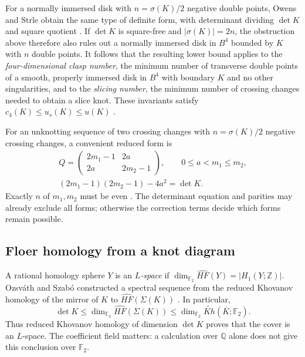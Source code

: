 \documentclass[12pt, oneside]{amsart}
\newcommand{\bbz}{{\mathbb Z}}
\newcommand{\bbq}{{\mathbb Q}}
\newcommand{\dbc}{\Sigma}
\begin{document}
For a normally immersed disk with $n=\sigma(K)/2$ negative double points,
Owens and Strle obtain the same type of definite form, with determinant dividing
$\det K$ and square quotient \cite[Thm.~1]{OwensStrle}.
If $\det K$ is square-free and $|\sigma(K)|=2n$, the obstruction above therefore
also rules out a normally immersed disk in $B^4$ bounded by $K$ with $n$ double
points. It follows that the resulting lower bound applies to the
\emph{four-dimensional clasp number}, the minimum number of transverse double
points of a smooth, properly immersed disk in $B^4$ with boundary $K$ and no other
singularities, and to the \emph{slicing number}, the minimum number of crossing changes
needed to obtain a slice knot. These invariants satisfy
$c_4(K)\le u_s(K)\le u(K)$ \cite[\S1]{OwensStrle}.

For an unknotting sequence of two crossing changes with $n=\sigma(K)/2$ negative
crossing changes, a convenient reduced form is
\begin{equation}\label{eq:qtilde}
    \begin{gathered}
    Q=\begin{pmatrix}2m_1-1&2a\\2a&2m_2-1\end{pmatrix},\qquad 0\le a<m_1\le m_2,\\
    (2m_1-1)(2m_2-1)-4a^2=\det K.
    \end{gathered}
\end{equation}
Exactly $n$ of $m_1,m_2$ must be even \cite[Thm.~1]{Owens}.
The determinant equation and parities may already exclude all forms; otherwise the
correction terms decide which forms remain possible.

\subsection{Floer homology from a knot diagram}\label{sec:greene-background}

A rational homology sphere $Y$ is an \emph{$L$-space} if
$\dim_{\mathbb F_2}\widehat{HF}(Y)=|H_1(Y;\bbz)|$. Ozsv\'ath and Szab\'o
constructed a spectral sequence from the reduced Khovanov homology of the mirror
of $K$ to $\widehat{HF}(\dbc(K))$ \cite[Thm.~1.1 and Cor.~1.2]{OSbranched}. In particular,
\begin{equation}\label{eq:kh-lspace}
    \det K\le \dim_{\mathbb F_2}\widehat{HF}(\dbc(K))
       \le \dim_{\mathbb F_2}\widetilde{Kh}(\overline K;\mathbb F_2).
\end{equation}
Thus reduced Khovanov homology of dimension $\det K$ proves that the cover is an
$L$-space. The coefficient field matters: a calculation over $\bbq$ alone does not
give this conclusion over $\mathbb F_2$.
\end{document}
